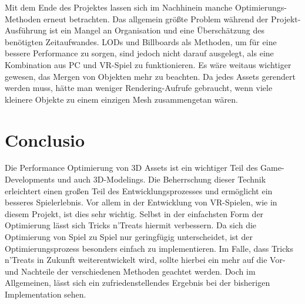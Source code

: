 Mit dem Ende des Projektes lassen sich im Nachhinein manche Optimierungs-Methoden erneut betrachten. Das allgemein größte Problem während der Projekt-Ausführung ist ein Mangel an Organisation und eine Überschätzung des benötigten Zeitaufwandes. LODs und Billboards als Methoden, um für eine bessere Performance zu sorgen, sind jedoch nicht darauf ausgelegt, als eine Kombination aus PC und VR-Spiel zu funktionieren. Es wäre weitaus wichtiger gewesen, das Mergen von Objekten mehr zu beachten. Da jedes Assets gerendert werden muss, hätte man weniger Rendering-Aufrufe gebraucht, wenn viele kleinere Objekte zu einem einzigen Mesh zusammengetan wären.\cite[S.154]{_unity_game_optimization}

\chapter{Conclusio}

Die Performance Optimierung von 3D Assets ist ein wichtiger Teil des Game-Developments und auch 3D-Modelings. Die Beherrschung dieser Technik erleichtert einen großen Teil des Entwicklungsprozesses und ermöglicht ein besseres Spielerlebnis. Vor allem in der Entwicklung von VR-Spielen, wie in diesem Projekt, ist dies sehr wichtig. Selbst in der einfachsten Form der Optimierung lässt sich Tricks n’Treats hiermit verbessern. Da sich die Optimierung von Spiel zu Spiel nur geringfügig unterscheidet, ist der Optimierungsprozess besonders einfach zu implementieren. Im Falle, dass Tricks n’Treats in Zukunft weiterentwickelt wird, sollte hierbei ein mehr auf die Vor- und Nachteile der verschiedenen Methoden geachtet werden. Doch im Allgemeinen, lässt sich ein zufriedenstellendes Ergebnis bei der bisherigen Implementation sehen.

